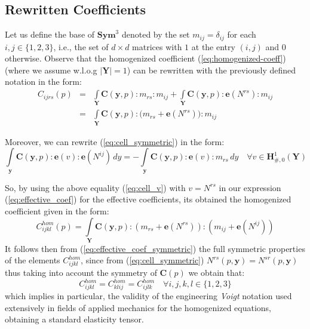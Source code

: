 \subsection{Rewritten Coefficients}
Let us define the base of $\mathbf{Sym}^3$ denoted by the set $m_{ij} = \delta_{ij}$ for each $i,j \in \{1,2,3\}$, i.e., the set of $d \times d$ matrices with $1$ at the entry $(i,j)$ and $0$ otherwise. Observe that the homogenized coefficient (\ref{eq:homogenized-coeff}) (where we assume w.l.o.g $\vert \mathbf{Y} \vert = 1$) can be rewritten with the previously defined notation in the form:
\begin{equation}
    \label{eq:effective_coef}
    \begin{array}{ccc}
        C_{ijrs}(p) &=& \int\limits_{\mathbf{Y}} \mathbf{C}(\mathbf{y},p):m_{rs}:m_{ij} + \int\limits_{\mathbf{Y}} \mathbf{C}(\mathbf{y},p):\mathbf{e}(N^{rs}):m_{ij} \\
         &=&\int\limits_{\mathbf{Y}} \mathbf{C}(\mathbf{y},p):\big(m_{rs} + \mathbf{e}(N^{rs})\big):m_{ij}
    \end{array}
\end{equation}

Moreover, we can rewrite (\ref{eq:cell_symmetric}) in the form:
\begin{equation}
    \label{eq:cell_v}
    \int\limits_{\mathbf{y}}\mathbf{C}(\mathbf{y},p):\mathbf{e}(v): \mathbf{e}(N^{ij}) \, dy = - \int\limits_{\mathbf{y}} \mathbf{C}(\mathbf{y},p):\mathbf{e}(v):m_{rs}\, dy \quad \forall v \in \mathbf{H}^1_{\#,0}(\mathbf{Y})
\end{equation}

So, by using the above equality (\ref{eq:cell_v}) with $v = N^{rs}$ in our expression (\ref{eq:effective_coef}) for the effective coefficients, its obtained the homogenized coefficient given in the form:
\begin{equation}
    \label{eq:effective_coef_symmetric}
    C_{ijkl}^{hom}(p) = \int\limits_{\mathbf{Y}} \mathbf{C}(\mathbf{y},p):(m_{rs}+\mathbf{e}(N^{rs})):(m_{ij}+\mathbf{e}(N^{ij}))
\end{equation}
It follows then from (\ref{eq:effective_coef_symmetric}) the full symmetric properties of the elements $C^{hom}_{ijkl}$, since from (\ref{eq:cell_symmetric}) $N^{rs}(p,\mathbf{y}) = N^{sr}(p, \mathbf{y})$ thus taking into account the symmetry of $\mathbf{C}(p)$ we obtain that:
\begin{equation*}
    C^{hom}_{ijkl} = C^{hom}_{klij} = C^{hom}_{ijlk} \quad \forall i,j,k,l \in \{1,2,3\}
\end{equation*}
which implies in particular, the validity of the engineering \textit{Voigt} notation used extensively in fields of applied mechanics for the homogenized equations, obtaining a standard elasticity tensor.

